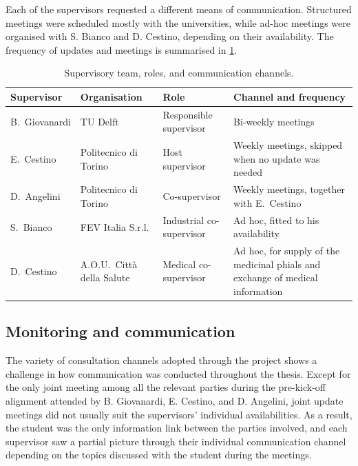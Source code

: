 Each of the supervisors requested a different means of communication. Structured meetings were scheduled mostly with the universities, while ad-hoc meetings were organised with S. Bianco and D. Cestino, depending on their availability. The frequency of updates and meetings is summarised in \cref{tab:pm-supervisors}.
\begin{table}[htbp]
    \centering
    \caption{Supervisory team, roles, and communication channels.}
    \label{tab:pm-supervisors}
    \small
    \begin{tabularx}{\textwidth}{@{}l l l X@{}}
        \toprule
        \textbf{Supervisor} & \textbf{Organisation} & \textbf{Role} & \textbf{Channel and frequency} \\
        \midrule
        B.~Giovanardi & TU Delft                  & Responsible supervisor    & Bi-weekly meetings \\
        E.~Cestino    & Politecnico di Torino     & Host supervisor           & Weekly meetings, skipped when no update was needed \\
        D.~Angelini   & Politecnico di Torino     & Co-supervisor             & Weekly meetings, together with E.~Cestino \\
        S.~Bianco     & FEV Italia S.r.l.         & Industrial co-supervisor  & Ad hoc, fitted to his availability \\
        D.~Cestino    & A.O.U.\ Città della Salute & Medical co-supervisor     & Ad hoc, for supply of the medicinal phials and exchange of medical information \\
        \bottomrule
    \end{tabularx}
\end{table}

\subsection{Monitoring and communication}
The variety of consultation channels adopted through the project shows a challenge in how communication was conducted throughout the thesis. Except for the only joint meeting among all the relevant parties during the pre-kick-off alignment attended by B. Giovanardi, E. Cestino, and D. Angelini, joint update meetings did not usually suit the supervisors' individual availabilities. As a result, the student was the only information link between the parties involved, and each supervisor saw a partial picture through their individual communication channel depending on the topics discussed with the student during the meetings. 

